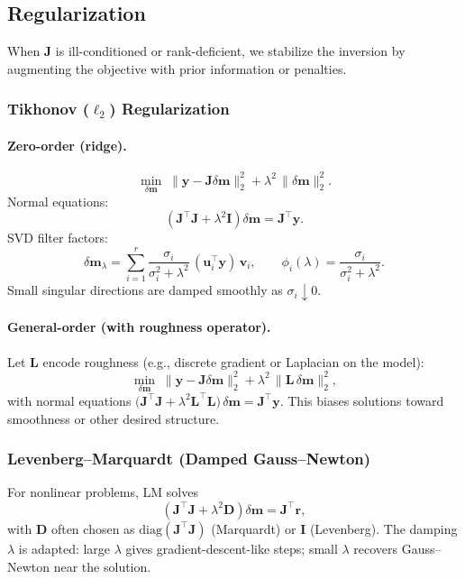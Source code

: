 \subsection{Regularization}\label{subsec:reg}
When $\mathbf{J}$ is ill-conditioned or rank-deficient, we stabilize the inversion by augmenting the objective with prior information or penalties.

\subsubsection{Tikhonov ($\ell_2$) Regularization}
\paragraph{Zero-order (ridge).}
\[
\min_{\delta\mathbf{m}} \; \|\mathbf{y}-\mathbf{J}\delta\mathbf{m}\|_2^2 + \lambda^2 \,\|\delta\mathbf{m}\|_2^2.
\]
Normal equations:
\[
\left(\mathbf{J}^\top \mathbf{J} + \lambda^2 \mathbf{I}\right)\delta\mathbf{m} = \mathbf{J}^\top \mathbf{y}.
\]
SVD filter factors:
\[
\delta\mathbf{m}_\lambda = \sum_{i=1}^r \frac{\sigma_i}{\sigma_i^2+\lambda^2}\,(\mathbf{u}_i^\top \mathbf{y})\,\mathbf{v}_i,\qquad
\phi_i(\lambda)=\frac{\sigma_i}{\sigma_i^2+\lambda^2}.
\]
Small singular directions are damped smoothly as $\sigma_i \downarrow 0$.

\paragraph{General-order (with roughness operator).}
Let $\mathbf{L}$ encode roughness (e.g., discrete gradient or Laplacian on the model):
\[
\min_{\delta\mathbf{m}} \; \|\mathbf{y}-\mathbf{J}\delta\mathbf{m}\|_2^2 + \lambda^2 \,\|\mathbf{L}\,\delta\mathbf{m}\|_2^2,
\]
with normal equations $\big(\mathbf{J}^\top \mathbf{J} + \lambda^2 \mathbf{L}^\top \mathbf{L}\big)\,\delta\mathbf{m} = \mathbf{J}^\top \mathbf{y}$. This biases solutions toward smoothness or other desired structure.

\subsubsection{Levenberg--Marquardt (Damped Gauss--Newton)}
For nonlinear problems, LM solves
\[
\left(\mathbf{J}^\top\mathbf{J} + \lambda^2 \mathbf{D}\right)\delta\mathbf{m} = \mathbf{J}^\top \mathbf{r},
\]
with $\mathbf{D}$ often chosen as $\mathrm{diag}(\mathbf{J}^\top \mathbf{J})$ (Marquardt) or $\mathbf{I}$ (Levenberg). The damping $\lambda$ is adapted: large $\lambda$ gives gradient-descent-like steps; small $\lambda$ recovers Gauss--Newton near the solution.

